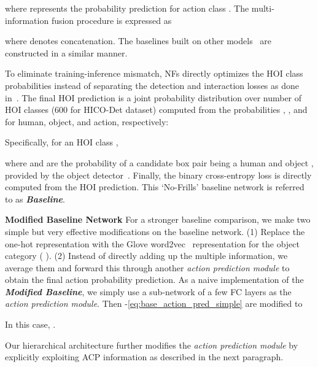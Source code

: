 where  represents the probability prediction for action class .
The multi-information fusion procedure  is expressed as 
 
 where 
 denotes concatenation. The baselines built on other models~\cite{gao2020drg,liao2020ppdm} are constructed in a similar manner.


To eliminate training-inference mismatch, NFs directly optimizes the HOI class probabilities instead of separating the detection and interaction losses as done in~\cite{gao2018ican,gkioxari2018detecting}. The final HOI prediction is a joint probability distribution over  number of HOI classes (600 for HICO-Det dataset)  {computed from the probabilities , , and  for human, object, and action, respectively:}

Specifically, for an HOI class ,

where  and  are the probability of a candidate box pair being a human  and object , provided by the object detector~\cite{ren2015faster}. Finally, the binary cross-entropy loss  is directly computed from the HOI prediction.
This ‘No-Frills’ baseline network is referred to as \emph{\textbf{Baseline}}.



\noindent\textbf{Modified Baseline Network} 
{For a stronger baseline comparison,}
we make two {simple} but very effective modifications on the baseline network.
(1) Replace the one-hot representation with the Glove word2vec~\cite{pennington2014glove} representation for the object category ( ).
(2) Instead of directly adding up the multiple information, we average them and forward this through another \emph{action prediction module}
to obtain the final action probability prediction. As a naive implementation of the \emph{\textbf{Modified  Baseline}}, we simply use a sub-network  of a few FC layers as the \emph{action prediction module}.
Then -\ref{eq:base_action_pred_simple} are modified to

 
 In this case, . 

Our hierarchical architecture further modifies the \emph{action prediction module} by explicitly exploiting ACP information as described in the next paragraph.












